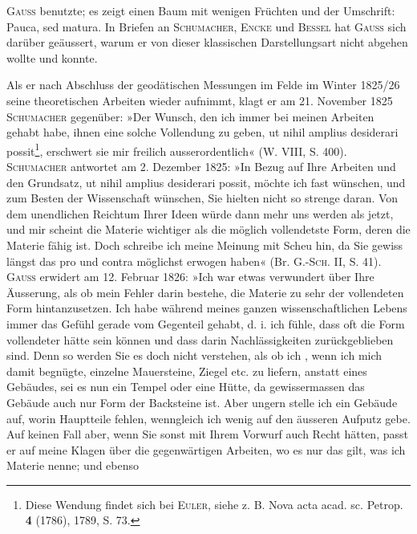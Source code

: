 \textsc{Gauss} benutzte; es zeigt einen Baum mit wenigen Früchten und der Umschrift:
Pauca, sed matura.
\clearpage{}\setcounter{footnote}{0}
\noindent\hspace*{\parindent}In Briefen an \textsc{Schumacher}, \textsc{Encke} und \textsc{Bessel} hat \textsc{Gauss} sich darüber
geäussert, warum er von dieser klassischen Darstellungsart nicht abgehen
wollte und konnte.
\par
Als er nach Abschluss der geodätischen Messungen im Felde im Winter
1825/26 seine theoretischen Arbeiten wieder aufnimmt, klagt er am 21. November
1825 \textsc{Schumacher} gegenüber: »Der Wunsch, den ich immer bei meinen
Arbeiten gehabt habe, ihnen eine solche Vollendung zu geben, ut nihil amplius
desiderari possit\footnote{Diese Wendung findet sich bei \textsc{Euler}, siehe z. B. Nova acta acad. sc. Petrop. \textbf{4} (1786), 1789, S. 73.}, erschwert sie mir freilich ausserordentlich« (W. VIII, S. 400).
\textsc{Schumacher} antwortet am 2. Dezember 1825: »In Bezug auf Ihre Arbeiten und
den Grundsatz, ut nihil amplius desiderari possit, möchte ich fast wünschen,
und zum Besten der Wissenschaft wünschen, Sie hielten nicht so strenge daran.
Von dem unendlichen Reichtum Ihrer Ideen würde dann mehr uns werden
als jetzt, und mir scheint die Materie wichtiger als die möglich vollendetste
Form, deren die Materie fähig ist. Doch schreibe ich meine Meinung mit
Scheu hin, da Sie gewiss längst das pro und contra möglichst erwogen haben«
(Br. G.-\textsc{Sch.} II, S. 41). \textsc{Gauss} erwidert am 12. Februar 1826: »Ich war etwas
verwundert über Ihre Äusserung, als ob mein Fehler darin bestehe, die Materie
zu sehr der vollendeten Form hintanzusetzen. Ich habe während meines
ganzen wissenschaftlichen Lebens immer das Gefühl gerade vom Gegenteil
gehabt, d. i. ich fühle, dass oft die Form vollendeter hätte sein können und
dass darin Nachlässigkeiten zurückgeblieben sind. Denn so werden Sie es
doch nicht verstehen, als ob ich , wenn ich mich damit begnügte, einzelne Mauersteine, Ziegel etc. zu
liefern, anstatt eines Gebäudes, sei es nun ein Tempel oder eine Hütte, da
gewissermassen das Gebäude auch nur Form der Backsteine ist. Aber ungern
stelle ich ein Gebäude auf, worin Hauptteile fehlen, wenngleich ich wenig
auf den äusseren Aufputz gebe. Auf keinen Fall aber, wenn Sie sonst mit
Ihrem Vorwurf auch Recht hätten, passt er auf meine Klagen über die gegenwärtigen
Arbeiten, wo es nur das gilt, was ich Materie nenne; und ebenso
